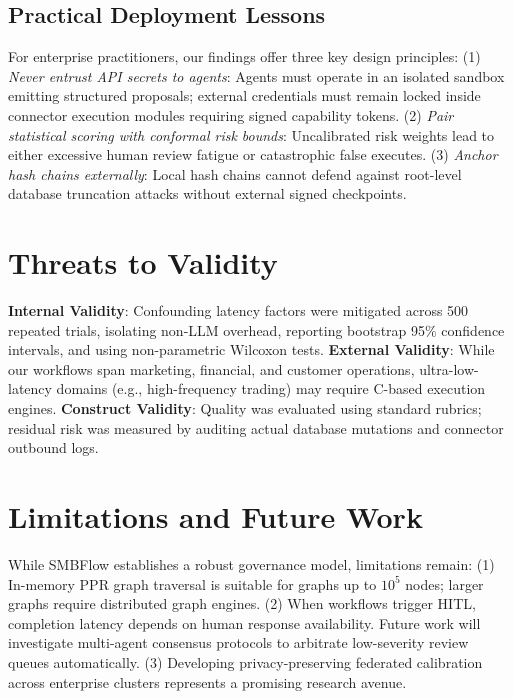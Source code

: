 \documentclass[conference]{IEEEtran}
\begin{document}
\subsection{Practical Deployment Lessons}
For enterprise practitioners, our findings offer three key design principles: (1) \emph{Never entrust API secrets to agents}: Agents must operate in an isolated sandbox emitting structured proposals; external credentials must remain locked inside connector execution modules requiring signed capability tokens. (2) \emph{Pair statistical scoring with conformal risk bounds}: Uncalibrated risk weights lead to either excessive human review fatigue or catastrophic false executes. (3) \emph{Anchor hash chains externally}: Local hash chains cannot defend against root-level database truncation attacks without external signed checkpoints.

\section{Threats to Validity}

\textbf{Internal Validity}: Confounding latency factors were mitigated across 500 repeated trials, isolating non-LLM overhead, reporting bootstrap 95\% confidence intervals, and using non-parametric Wilcoxon tests.
\textbf{External Validity}: While our workflows span marketing, financial, and customer operations, ultra-low-latency domains (e.g., high-frequency trading) may require C-based execution engines.
\textbf{Construct Validity}: Quality was evaluated using standard rubrics; residual risk was measured by auditing actual database mutations and connector outbound logs.

\section{Limitations and Future Work}

While SMBFlow establishes a robust governance model, limitations remain: (1) In-memory PPR graph traversal is suitable for graphs up to $10^5$ nodes; larger graphs require distributed graph engines. (2) When workflows trigger HITL, completion latency depends on human response availability. Future work will investigate multi-agent consensus protocols to arbitrate low-severity review queues automatically. (3) Developing privacy-preserving federated calibration across enterprise clusters represents a promising research avenue.
\end{document}
